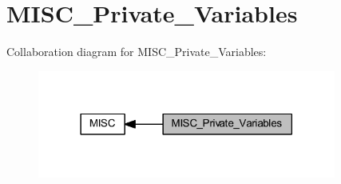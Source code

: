 \hypertarget{group___m_i_s_c___private___variables}{}\section{M\+I\+S\+C\+\_\+\+Private\+\_\+\+Variables}
\label{group___m_i_s_c___private___variables}
Collaboration diagram for M\+I\+S\+C\+\_\+\+Private\+\_\+\+Variables\+:
\nopagebreak
\begin{figure}[H]
\begin{center}
\leavevmode
\includegraphics[width=278pt]{group___m_i_s_c___private___variables}
\end{center}
\end{figure}

